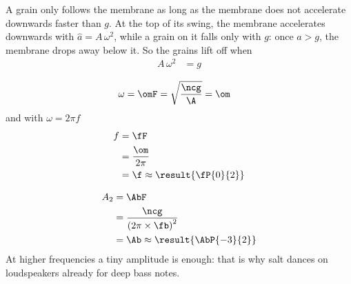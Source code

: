A grain only follows the membrane as long as the membrane does not accelerate downwards faster than $g$. At the top of its swing, the membrane accelerates downwards with $\hat a = A\,\omega^2$, while a grain on it falls only with $g$: once $\hat a > g$, the membrane drops away below it. So the grains lift off when
\begin{align}
 A\,\omega^2 &= g
\end{align}

\begin{abcliste}
\abc
\begin{align}
 \omega &= \omF = \sqrt{\frac{\ncg}{\A}} = \om
\end{align}
and with $\omega = 2\pi f$
\begin{align}
 f &= \fF \\
   &= \frac{\om}{2\pi} \\
   &= \f \approx \result{\fP{0}{2}}
\end{align}

\abc
\begin{align}
 A_2 &= \AbF \\
   &= \frac{\ncg}{\left(2\pi\times\fb\right)^2} \\
   &= \Ab \approx \result{\AbP{-3}{2}}
\end{align}
At higher frequencies a tiny amplitude is enough: that is why salt dances on loudspeakers already for deep bass notes.
\end{abcliste}
